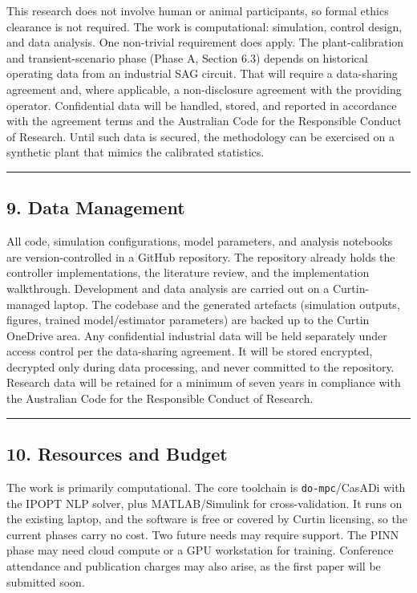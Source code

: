 \documentclass[
  14pt,
]{extarticle}
\begin{document}
This research does not involve human or animal participants, so formal
ethics clearance is not required. The work is computational: simulation,
control design, and data analysis. One non-trivial requirement does
apply. The plant-calibration and transient-scenario phase (Phase A,
Section 6.3) depends on historical operating data from an industrial SAG
circuit. That will require a data-sharing agreement and, where
applicable, a non-disclosure agreement with the providing operator.
Confidential data will be handled, stored, and reported in accordance
with the agreement terms and the Australian Code for the Responsible
Conduct of Research. Until such data is secured, the methodology can be
exercised on a synthetic plant that mimics the calibrated statistics.

\begin{center}\rule{0.5\linewidth}{0.5pt}\end{center}

\subsection{9. Data Management}\label{data-management}

All code, simulation configurations, model parameters, and analysis
notebooks are version-controlled in a GitHub repository. The repository
already holds the controller implementations, the literature review, and
the implementation walkthrough. Development and data analysis are
carried out on a Curtin-managed laptop. The codebase and the generated
artefacts (simulation outputs, figures, trained model/estimator
parameters) are backed up to the Curtin OneDrive area. Any confidential
industrial data will be held separately under access control per the
data-sharing agreement. It will be stored encrypted, decrypted only
during data processing, and never committed to the repository. Research
data will be retained for a minimum of seven years in compliance with
the Australian Code for the Responsible Conduct of Research.

\begin{center}\rule{0.5\linewidth}{0.5pt}\end{center}

\subsection{10. Resources and Budget}\label{resources-and-budget}

The work is primarily computational. The core toolchain is
\texttt{do-mpc}/CasADi with the IPOPT NLP solver, plus MATLAB/Simulink
for cross-validation. It runs on the existing laptop, and the software
is free or covered by Curtin licensing, so the current phases carry no
cost. Two future needs may require support. The PINN phase may need
cloud compute or a GPU workstation for training. Conference attendance
and publication charges may also arise, as the first paper will be
submitted soon.
\end{document}
